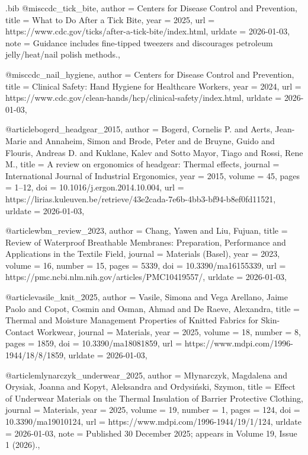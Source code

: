 \begin{filecontents*}{\jobname.bib}
@misc{cdc_tick_bite,
  author       = {{Centers for Disease Control and Prevention}},
  title        = {What to Do After a Tick Bite},
  year         = {2025},
  url          = {https://www.cdc.gov/ticks/after-a-tick-bite/index.html},
  urldate      = {2026-01-03},
  note         = {Guidance includes fine-tipped tweezers and discourages petroleum jelly/heat/nail polish methods.},
}

@misc{cdc_nail_hygiene,
  author       = {{Centers for Disease Control and Prevention}},
  title        = {Clinical Safety: Hand Hygiene for Healthcare Workers},
  year         = {2024},
  url          = {https://www.cdc.gov/clean-hands/hcp/clinical-safety/index.html},
  urldate      = {2026-01-03},
}

@article{bogerd_headgear_2015,
  author       = {Bogerd, Cornelis P. and Aerts, Jean-Marie and Annaheim, Simon and Brode, Peter and de Bruyne, Guido and Flouris, Andreas D. and Kuklane, Kalev and Sotto Mayor, Tiago and Rossi, Rene M.},
  title        = {A review on ergonomics of headgear: Thermal effects},
  journal      = {International Journal of Industrial Ergonomics},
  year         = {2015},
  volume       = {45},
  pages        = {1--12},
  doi          = {10.1016/j.ergon.2014.10.004},
  url          = {https://lirias.kuleuven.be/retrieve/43e2cada-7e6b-4bb3-bf94-b8ef0fd11521},
  urldate      = {2026-01-03},
}

@article{wbm_review_2023,
  author       = {Chang, Yawen and Liu, Fujuan},
  title        = {Review of Waterproof Breathable Membranes: Preparation, Performance and Applications in the Textile Field},
  journal      = {Materials (Basel)},
  year         = {2023},
  volume       = {16},
  number       = {15},
  pages        = {5339},
  doi          = {10.3390/ma16155339},
  url          = {https://pmc.ncbi.nlm.nih.gov/articles/PMC10419557/},
  urldate      = {2026-01-03},
}

@article{vasile_knit_2025,
  author       = {Vasile, Simona and Vega Arellano, Jaime Paolo and Copot, Cosmin and Osman, Ahmad and De Raeve, Alexandra},
  title        = {Thermal and Moisture Management Properties of Knitted Fabrics for Skin-Contact Workwear},
  journal      = {Materials},
  year         = {2025},
  volume       = {18},
  number       = {8},
  pages        = {1859},
  doi          = {10.3390/ma18081859},
  url          = {https://www.mdpi.com/1996-1944/18/8/1859},
  urldate      = {2026-01-03},
}

@article{mlynarczyk_underwear_2025,
  author       = {M{\l}ynarczyk, Magdalena and Orysiak, Joanna and Kopyt, Aleksandra and Ordysi{\'n}ski, Szymon},
  title        = {Effect of Underwear Materials on the Thermal Insulation of Barrier Protective Clothing},
  journal      = {Materials},
  year         = {2025},
  volume       = {19},
  number       = {1},
  pages        = {124},
  doi          = {10.3390/ma19010124},
  url          = {https://www.mdpi.com/1996-1944/19/1/124},
  urldate      = {2026-01-03},
  note         = {Published 30 December 2025; appears in Volume 19, Issue 1 (2026).},
}


\end{filecontents*}
